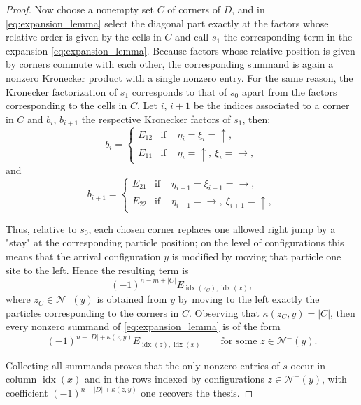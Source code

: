 \documentclass{article}
\begin{document}
\begin{proof}
Now choose a nonempty set $C$ of corners of $D$, and in \eqref{eq:expansion_lemma} select the diagonal part exactly at the factors whose relative order is given by the cells in $C$ and call $s_1$ the corresponding term in the expansion \eqref{eq:expansion_lemma}. Because factors whose relative position is given by corners commute with each other, the corresponding summand is again a nonzero Kronecker 
product with a single nonzero entry. For the same reason, the Kronecker factorization of $s_1$ corresponds to that of $s_0$ apart from the factors corresponding to the cells in $C$. Let $i,\,i+1$ be the indices associated to a corner in $C$ and $b_i,\, b_{i+1}$ the respective Kronecker factors of $s_1$, then:
 \begin{equation*}
    b_{i}=\left\{
        \begin{array}{lll}
         E_{12}  &\text{if }  &\eta_{i}=\xi_{i}=\uparrow, \\ 
         E_{11}  &\text{if }  &\eta_{i}=\uparrow, \ \xi_{i}=\rightarrow,
        \end{array}\right.
\end{equation*}
and
\begin{equation*} 
    b_{i+1}=\left\{
        \begin{array}{lll}
         E_{21}  &\text{if }  &\eta_{i+1}=\xi_{i+1}=\rightarrow, \\ 
         E_{22}  &\text{if }  &\eta_{i+1}=\rightarrow, \ \xi_{i+1}=\uparrow,
        \end{array}\right.
    \end{equation*}

Thus, relative to $s_0$, each chosen corner replaces one allowed right jump by a "stay" at the corresponding particle position; on the level of configurations this means that the arrival configuration $y$ is modified by moving that particle one site to the left. Hence the resulting term is
\[
(-1)^{n-m+|C|}E_{\operatorname{idx}(z_C),\operatorname{idx}(x)},
\]
where $z_C\in\mathcal{N}^-(y)$ is obtained from $y$ by moving to the left exactly the particles corresponding to the corners in $C$. Observing that $\kappa(z_C,y)=|C|$, then every nonzero summand of \eqref{eq:expansion_lemma} is of the form
\[
(-1)^{n-|D|+\kappa(z,y)}E_{\operatorname{idx}(z),\operatorname{idx}(x)}
\qquad\text{for some }z\in\mathcal{N}^-(y).
\]

Collecting all summands proves that the only nonzero entries of $s$ occur in column $\operatorname{idx}(x)$ and in the rows indexed by configurations $z\in\mathcal{N}^-(y)$, with coefficient $(-1)^{n-|D|+\kappa(z,y)}$ one recovers the thesis.

\end{proof}
\end{document}
